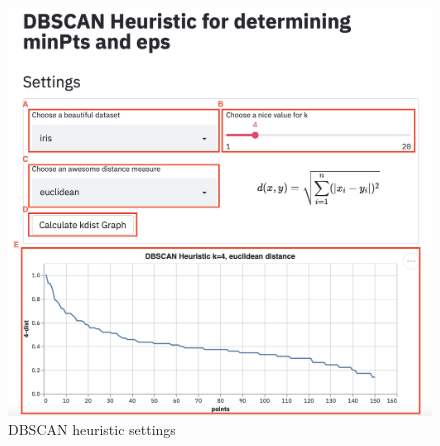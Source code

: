 \begin{figure}[H]
	\centering
	\includegraphics[width=\linewidth]{modules/web_frontend/dbscan_heuristic.png}
	\caption{DBSCAN heuristic settings}\label{fig:heuristicfrontend}
\end{figure}